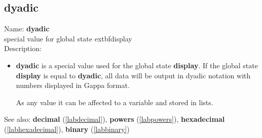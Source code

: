\subsection{dyadic}
\label{labdyadic}
\noindent Name: \textbf{dyadic}\\
special value for global state 	extbf{display}\\
\noindent Description: \begin{itemize}

\item \textbf{dyadic} is a special value used for the global state \textbf{display}.
   If the global state \textbf{display} is equal to \textbf{dyadic}, all data will
   be output in dyadic notation with numbers displayed in Gappa format.
    
   As any value it can be affected to a variable and stored in lists.
\end{itemize}
See also: \textbf{decimal} (\ref{labdecimal}), \textbf{powers} (\ref{labpowers}), \textbf{hexadecimal} (\ref{labhexadecimal}), \textbf{binary} (\ref{labbinary})
